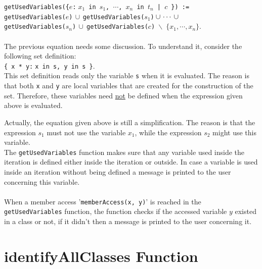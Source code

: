 \documentclass[11pt]{report}
\begin{document}
\texttt{getUsedVariables(\{$e$:$\;x_1$ in $s_1$, $\cdots$, $x_n$ in $t_n$ | $c$ \}) :=} \\[0.2cm]
      \hspace*{0.8cm} 
      \texttt{getUsedVariables($e$)$\,\cup\, $getUsedVariables($s_1$)$\,\cup \,\cdots\, \cup\,
     \\ \hspace*{0.9cm} 
       $getUsedVariables($s_n$)$\,\cup\
                  $getUsedVariables($c$) $\backslash$ $\{x_1, \cdots, x_n \}$}.
\\
\\
      The previous equation needs some discussion.   To understand it, consider the following set definition:
      \\[0.2cm]
      \hspace*{1.3cm}
      \texttt{\{ x * y:$\;$x in s, y in s \}}.
      \\[0.2cm]
      This set definition reads only the variable \texttt{s} when it is evaluated.  The reason is that
      both \texttt{x} and \texttt{y} are local variables that are created for the construction of
      the set.  Therefore, these variables need \underline{not} be defined when the expression given
      above is evaluated.

      Actually, the equation given above is still a simplification.  The reason is that 
      the expression $s_1$ must not use the variable $x_1$, while the expression $s_2$ might use
      this variable.
\\

The \texttt{getUsedVariables} function makes sure that any variable used inside the iteration is defined either inside the iteration or outside. In case a variable is used inside an iteration without being defined a message is printed to the user concerning this variable.
\\
\\

When a member access '\texttt{memberAccess(x, y)}' is reached in the \texttt{getUsedVariables} function, the function checks if the accessed variable $y$ existed in a class or not, if it didn't then a message is printed to the user concerning it.

\section{identifyAllClasses Function}
\end{document}
